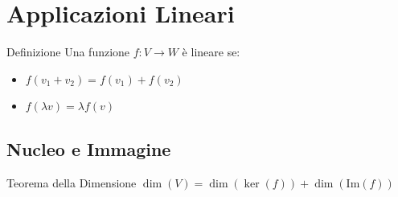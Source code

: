 \section{Applicazioni Lineari}

\begin{concept}{Definizione}
Una funzione $f: V \to W$ è lineare se:
\begin{itemize}
    \item $f(v_1 + v_2) = f(v_1) + f(v_2)$
    \item $f(\lambda v) = \lambda f(v)$
\end{itemize}
\end{concept}

\subsection{Nucleo e Immagine}
\begin{concept}{Teorema della Dimensione}
$\dim(V) = \dim(\ker(f)) + \dim(\text{Im}(f))$
\end{concept}

